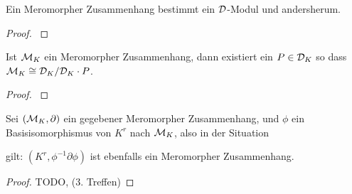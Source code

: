 \begin{thm} 
  \cite[Thm 4.3.2]{sabbah_cimpa90}
  Ein Meromorpher Zusammenhang bestimmt ein $\mathcal{D}$-Modul
  und andersherum.
\end{thm}
\begin{proof}
  \cite[Thm 4.3.2]{sabbah_cimpa90}
\end{proof}

\begin{lem} 
  \cite[Satz 4.12]{ZulaBarbara}
  \cite[Thm 4.3.2]{sabbah_cimpa90}
  Ist $\mathcal{M}_K$ ein Meromorpher Zusammenhang, dann existiert ein $P\in\mathcal{D}_K$ so dass
  $\mathcal{M}_K\cong\mathcal{D}_K/\mathcal{D}_K\cdot P$.
\end{lem}
\begin{proof}
  \cite[Satz 4.12]{ZulaBarbara}
\end{proof}

\begin{lem}
  Sei $(\mathcal{M}_K,\partial)$ ein gegebener Meromorpher Zusammenhang, und $\phi$ ein
  Basisisomorphismus von $K^r$ nach $\mathcal{M}_K$, also in der Situation
  \begin{center}
  \end{center}
  gilt: $(K^r,\phi^{-1}\partial\phi)$ ist ebenfalls ein Meromorpher Zusammenhang.
\end{lem}
\begin{proof}
  TODO, (3. Treffen)
\end{proof}

